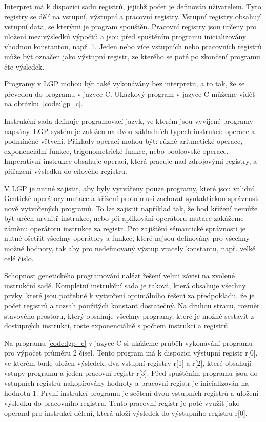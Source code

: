 Interpret má k dispozici sadu registrů, jejichž počet je definován uživatelem.
Tyto registry se dělí na vstupní, výstupní a pracovní registry.
Vstupní registry obsahují vstupní data, se kterými je program spouštěn.
Pracovní registry jsou určeny pro uložení mezivýsledků výpočtů a jsou před spuštěním programu inicializovány vhodnou konstantou, např. 1.
Jeden nebo více vstupních nebo pracovních registrů může být označen jako výstupní registr, ze kterého se poté po zkončení programu čte výsledek.

Programy v LGP mohou být také vykonávány bez interpretu, a to tak, že se převedou do programu v jazyce C.
Ukázkový program v jazyce C můžeme vidět na obrázku~\ref{code:lgp_c}.

Instrukční sada definuje programovací jazyk, ve kterém jsou vyvíjené programy napsány.
LGP systém je založen na dvou základních typech instrukcí: operace a podmíněné větvení.
Příklady operací mohou být: různé aritmetické operace, exponenciální funkce, trigonometrické funkce, nebo booleovské operace.
Imperativní instrukce obsahuje operaci, která pracuje nad zdrojovými registry, a přiřazení výsledku do cílového registru.

V LGP je nutné zajistit, aby byly vytvářeny pouze programy, které jsou validní.
Gentické operátory mutace a křížení proto musí zachovat syntaktickou správnost nově vytvořených programů.
To lze zajistit například tak, že bod křížení nemůže být určen urvnitř instrukce, nebo při aplikováni operátoru mutace zakážeme záměnu operátoru instrukce za registr.
Pro zajištění sémantické správnosti je nutné ošetřit všechny operátory a funkce, které nejsou definovány pro všechny možné hodnoty, tak aby pro nedefinovaný výstup vracely konstantu, např. velké celé číslo.

Schopnost genetického programování nalézt řešení velmi závisí na zvolené instrukční sadě.
Kompletní instrukční sada je taková, která obsahuje všechny prvky, které jsou potřebné k vytvoření optimálního řešení za předpokladu, že je počet registrů a rozsah použitých konstant dostatečný.
Na druhou stranu, rozměr stavového prostoru, který obsahuje všechny programy, které je možné sestavit z dostupných instrukcí, roste exponenciálně s počtem instrukcí a registrů.

Na programu \ref{code:lgp_c} v jazyce C si ukážeme průběh vykonávání programu pro výpočet průměru 2 čísel.
Tento program má k dispozici výstupní registr r[0], ve kterém bude uložen výsledek, dva vstupní registry r[1] a r[2], které obsahují vstupy programu a jeden pracovní registr r[3].
Před spuštěním programu jsou do vstupních registrů nakopírovány hodnoty a pracovní registr je inicializován na hodnotu 1.
První instrukcí programu je sečtení dvou vstupních registrů a uložení výsledku do pracovního registru.
Tento pracovní registr je poté využit jako operand pro instrukci dělení, která uloží výsledek do výstupního registru r[0].


